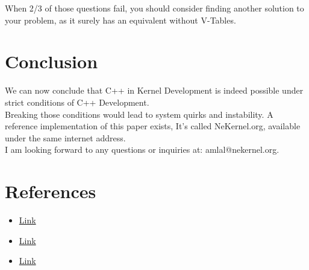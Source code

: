 \documentclass[11pt, a4paper]{article}
\begin{document}
When 2/3 of those questions fail, you should consider finding another solution to your problem, as it surely has an equivalent without V-Tables.

\section{Conclusion}
{
We can now conclude that C++ in Kernel Development is indeed possible under strict conditions of C++ Development. \\
Breaking those conditions would lead to system quirks and instability.
A reference implementation of this paper exists, It's called NeKernel.org, available under the same internet address. \\
I am looking forward to any questions or inquiries at: amlal@nekernel.org.
}

\section{References}
{
\begin{itemize}
    \item[EKA2:] \href{https://en.wikipedia.org/wiki/EKA2}{Link}
    \item[NeKernel.org:] \href{https://nekernel.org}{Link}
    \item[Virtual Method Tables:] \href{https://en.wikipedia.org/wiki/Virtual_method_table}{Link}
\end{itemize}
}
\end{document}
